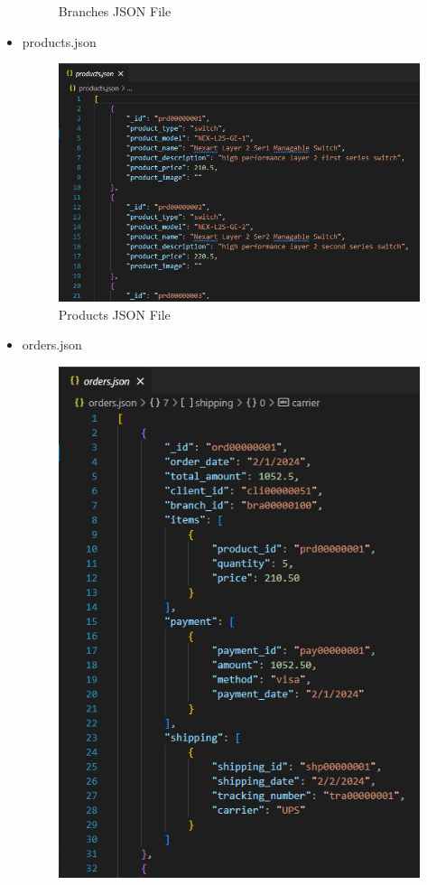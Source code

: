 \documentclass[a4Paper,12pt]{report}
\begin{document}
\begin{itemize}
\begin{figure}[H]
\caption{Branches JSON File}
\end{figure}
\item products.json
\begin{figure}[H]
\centering
\includegraphics[scale=0.4]{images/products_json.png}
\caption{Products JSON File}
\end{figure}
\item orders.json
\begin{figure}[H]
\centering
\includegraphics[scale=0.4]{images/orders_json.png}

\end{figure}
\end{itemize}
\end{document}
